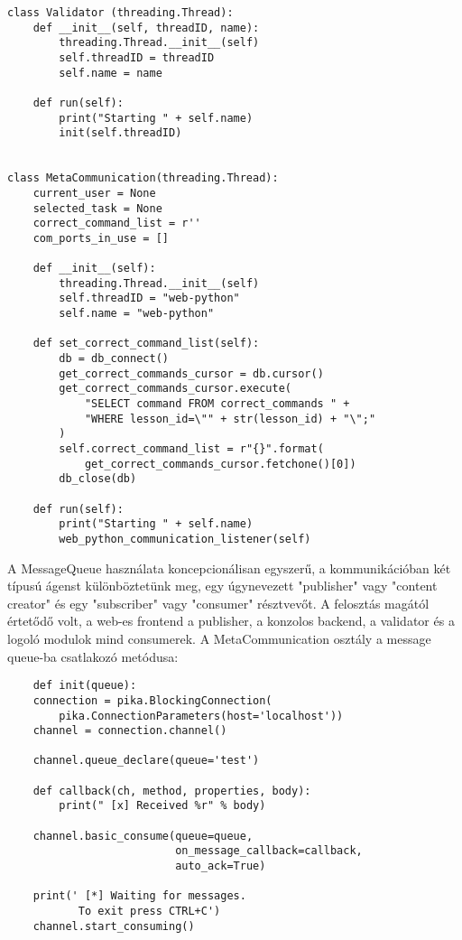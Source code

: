 \documentclass[12pt]{report}
\begin{document}
\begin{verbatim}
class Validator (threading.Thread):
    def __init__(self, threadID, name):
        threading.Thread.__init__(self)
        self.threadID = threadID
        self.name = name

    def run(self):
        print("Starting " + self.name)
        init(self.threadID)


class MetaCommunication(threading.Thread):
    current_user = None
    selected_task = None
    correct_command_list = r''
    com_ports_in_use = []

    def __init__(self):
        threading.Thread.__init__(self)
        self.threadID = "web-python"
        self.name = "web-python"

    def set_correct_command_list(self):
        db = db_connect()
        get_correct_commands_cursor = db.cursor()
        get_correct_commands_cursor.execute(
            "SELECT command FROM correct_commands " +
            "WHERE lesson_id=\"" + str(lesson_id) + "\";"
        )
        self.correct_command_list = r"{}".format(
            get_correct_commands_cursor.fetchone()[0])
        db_close(db)

    def run(self):
        print("Starting " + self.name)
        web_python_communication_listener(self)
\end{verbatim}

A MessageQueue használata koncepcionálisan egyszerű, a kommunikációban két típusú ágenst különböztetünk meg, egy úgynevezett "publisher" vagy "content creator" és egy "subscriber" vagy "consumer" résztvevőt. A felosztás magától értetődő volt, a web-es frontend a publisher, a konzolos backend, a validator és a logoló modulok mind consumerek. A MetaCommunication osztály a message queue-ba csatlakozó metódusa:

\begin{verbatim}
    def init(queue):
    connection = pika.BlockingConnection(
        pika.ConnectionParameters(host='localhost'))
    channel = connection.channel()

    channel.queue_declare(queue='test')

    def callback(ch, method, properties, body):
        print(" [x] Received %r" % body)

    channel.basic_consume(queue=queue, 
                          on_message_callback=callback, 
                          auto_ack=True)

    print(' [*] Waiting for messages.
           To exit press CTRL+C')
    channel.start_consuming()

\end{verbatim}
\end{document}
